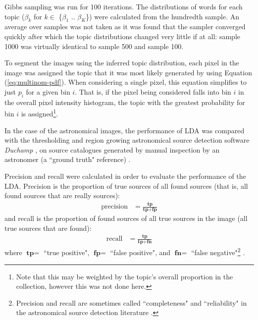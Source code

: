 Gibbs sampling was run for 100 iterations. The distributions of words for each topic ($\beta_k$ for $k \in$ \{$\beta_1$ .. $\beta_K$\}) were calculated from the hundredth sample. An average over samples was not taken as it was found that the sampler converged quickly after which the topic distributions changed very little if at all: sample 1000 was virtually identical to sample 500 and sample 100.

To segment the images using the inferred topic distribution, each pixel in the image was assigned the topic that it was most likely generated by using Equation (\ref{eq:multinom-pdf}). When considering a single pixel, this equation simplifies to just $p_i$ for a given bin $i$. That is, if the pixel being considered falls into bin $i$ in the overall pixel intensity histogram, the topic with the greatest probability for bin $i$ is assigned\footnote{Note that this may be weighted by the topic's overall proportion in the collection, however this was not done here.}. 


In the case of the astronomical images, the performance of LDA was compared with the thresholding and region growing astronomical source detection software \emph{Duchamp} \cite{whiting2012duchamp}, on source catalogues generated by manual inspection by an astronomer (a ``ground truth" reference) \cite{saripalli2012atlbs,subrahmanyan2010atlbs}. 


Precision and recall were calculated in order to evaluate the performance of the LDA. Precision is the proportion of true sources of all found sources (that is, all found sources that are really sources):
\begin{align}
\text{precision} &= \frac{\textbf{tp}}{\textbf{tp}+\textbf{fp}}
\end{align}
and recall is the proportion of found sources of all true sources in the image (all true sources that are found):
\begin{align}
\text{recall} &= \frac{\textbf{tp}}{\textbf{tp}+\textbf{fn}}
\end{align}
where $\textbf{tp} =$ ``true positive", $\textbf{fp} =$  ``false positive", and $\textbf{fn} =$ ``false negative"\footnote{Precision and recall are sometimes called ``completeness" and ``reliability" in the astronomical source detection literature \cite{hancock2012compact}.} \cite{olson2008advanced}.

